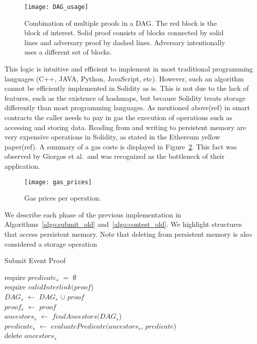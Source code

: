 \begin{figure}[hbt]
    \centering
    \texttt{[image: DAG\_usage]}
    \caption{Combination of multiple proofs in a DAG. The red block is the
        block of interest. Solid proof consists of blocks connected by solid
        lines and adversary proof by dashed lines. Adversary intentionally
        uses a different set of blocks.}
    \label{fig:DAG_usage}
\end{figure}

This logic is intuitive and efficient to implement in most traditional
programming languages (C++, JAVA, Python, JavaScript, etc). However, such an
algorithm cannot be efficiently implemented in Solidity as is. This is not
due to the lack of features, such as the existence of hashmaps, but because
Solidity treats storage differently than most programming languages. As
mentioned above(ref) in smart contracts the caller needs to pay in gas the
execution of operations such as accessing and storing data. Reading from and
writing to persistent memory are very expensive operations in Solidity, as
stated in the Ethereum yellow paper(ref). A summary of a gas costs is displayed
in Figure~\ref{fig:gas_prices}. This fact was observed by Giorgos et al.\ and
was recognized as the bottleneck of their application.

\begin{figure}[hbt]
    \centering
    \texttt{[image: gas\_prices]}
    \caption{Gas prices per operation.}
    \label{fig:gas_prices}
\end{figure}

We describe each phase of the previous implementation in
Algorithms~\ref{algo:submit_old} and~\ref{algo:contest_old}. We highlight
structures that access persistent memory. Note that deleting from persistent
memory is also considered a storage operation

\begin{algorithm}
    \caption{Submit Event Proof}
    \label{algo:submit_old}
    require $predicate_{s}$ $=$ $\emptyset$ \\
    require $validInterlink(proof$) \\
    $DAG_{s}$ $\leftarrow$ $DAG_{s}$ $\cup$ $proof$\\
    $proof_{s}$ $\leftarrow$ $proof$\\
    $ancestors_{s}$ $\leftarrow$ $findAncestors(DAG_{s}$)\\
    $predicate_{s}$ $\leftarrow$ $evaluatePredicate(ancestors_{s}$,
    $predicate$)\\
    delete $ancestors_{s}$\\
\end{algorithm}

